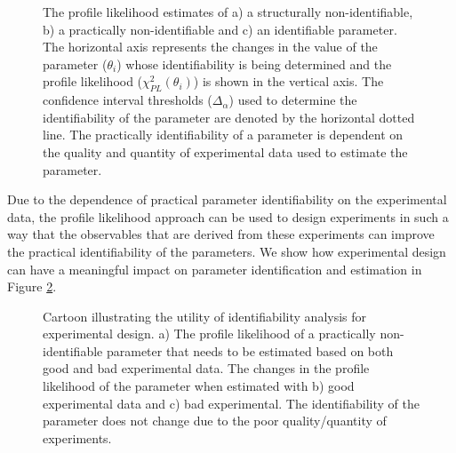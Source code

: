 \documentclass[10pt]{report}
\begin{document}
	\begin{figure}[!tbhp]
		\caption{The profile likelihood estimates of a) a structurally non-identifiable, b) a practically non-identifiable and c) an identifiable parameter. The horizontal axis represents the changes in the value of the parameter ($\theta_i$) whose identifiability is being determined and the profile likelihood ($\chi^2_{PL}(\theta_i)$) is shown in the vertical axis. The confidence interval thresholds ($\Delta_{\alpha}$) used to determine the identifiability of the parameter are denoted by the horizontal dotted line. The practically identifiability of a parameter is dependent on the quality and quantity of experimental data used to estimate the parameter.}\label{fig:ident-pl}
	\end{figure}\label{fig:identtypes}

	Due to the dependence of practical parameter identifiability on the experimental data, the profile likelihood approach can be used to design experiments in such a way that the observables that are derived from these experiments can improve the practical identifiability of the parameters. We show how experimental design can have a meaningful impact on parameter identification and estimation in Figure \ref{fig:edwithpl}.
		
	\begin{figure}[!tbhp]
		\caption{Cartoon illustrating the utility of identifiability analysis for experimental design. a) The profile likelihood of a practically non-identifiable parameter that needs to be estimated based on both good and bad experimental data. The changes in the profile likelihood of the parameter when estimated with b) good experimental data and c) bad experimental. The identifiability of the parameter does not change due to the poor quality/quantity of experiments.}\label{fig:edwithpl}
	\end{figure}	
	
\end{document}

